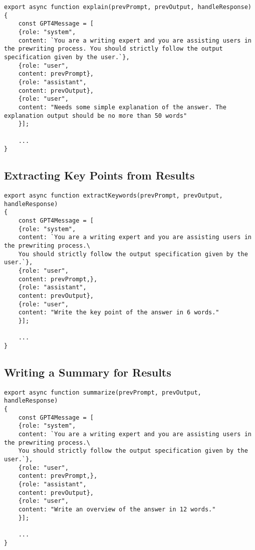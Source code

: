 \begin{verbatim}
export async function explain(prevPrompt, prevOutput, handleResponse)
{
    const GPT4Message = [
    {role: "system",
    content: `You are a writing expert and you are assisting users in the prewriting process. You should strictly follow the output specification given by the user.`},
    {role: "user",
    content: prevPrompt},
    {role: "assistant",
    content: prevOutput},
    {role: "user",
    content: "Needs some simple explanation of the answer. The explanation output should be no more than 50 words"
    }];

    ...
}
\end{verbatim}

\subsection{Extracting Key Points from Results}

\begin{verbatim}
export async function extractKeywords(prevPrompt, prevOutput, handleResponse)
{
    const GPT4Message = [
    {role: "system",
    content: `You are a writing expert and you are assisting users in the prewriting process.\
    You should strictly follow the output specification given by the user.`},
    {role: "user",
    content: prevPrompt,},
    {role: "assistant",
    content: prevOutput},
    {role: "user",
    content: "Write the key point of the answer in 6 words."
    }];

    ...
}
\end{verbatim}

\subsection{Writing a Summary for Results}

\begin{verbatim}
export async function summarize(prevPrompt, prevOutput, handleResponse)
{
    const GPT4Message = [
    {role: "system",
    content: `You are a writing expert and you are assisting users in the prewriting process.\
    You should strictly follow the output specification given by the user.`},
    {role: "user",
    content: prevPrompt,},
    {role: "assistant",
    content: prevOutput},
    {role: "user",
    content: "Write an overview of the answer in 12 words."
    }];

    ...
}
\end{verbatim}
\label{appendix}